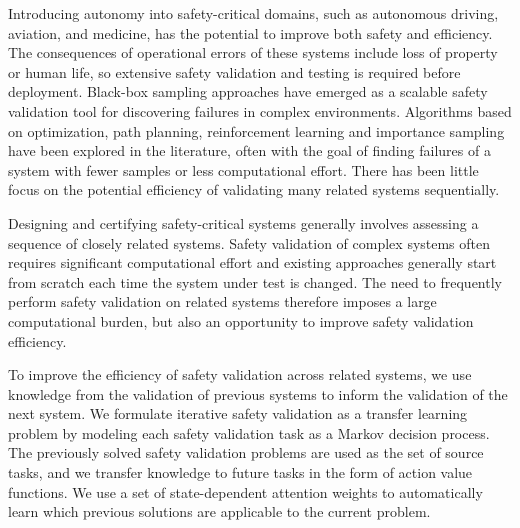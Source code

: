 Introducing autonomy into safety-critical domains, such as autonomous driving, aviation, and medicine, has the potential to improve both safety and efficiency. The consequences of operational errors of these systems include loss of property or human life, so extensive safety validation and testing is required before deployment. Black-box sampling approaches have emerged as a scalable safety validation tool for discovering failures in complex environments. Algorithms based on optimization, path planning, reinforcement learning and importance sampling have been explored in the literature, often with the goal of finding failures of a system with fewer samples or less computational effort. There has been little focus on the potential efficiency of validating many related systems sequentially. 


Designing and certifying safety-critical systems generally involves assessing a sequence of closely related systems. Safety validation of complex systems often requires significant computational effort and existing approaches generally start from scratch each time the system under test is changed. The need to frequently perform safety validation on related systems therefore imposes a large computational burden, but also an opportunity to improve safety validation efficiency. 

To improve the efficiency of safety validation across related systems, we use knowledge from the validation of previous systems to inform the validation of the next system. We formulate iterative safety validation as a transfer learning problem by modeling each safety validation task as a Markov decision process. The previously solved safety validation problems are used as the set of source tasks, and we transfer knowledge to future tasks in the form of action value functions. We use a set of state-dependent attention weights to automatically learn which previous solutions are applicable to the current problem.

